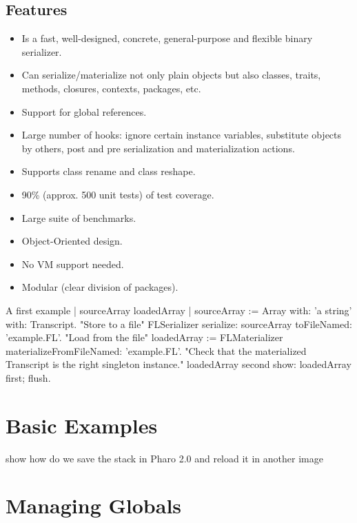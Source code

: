 \documentclass[a4paper,10pt,twoside]{book}
\begin{document}
\subsection{Features} 

\begin{itemize}

\item Is a fast, well-designed, concrete, general-purpose and flexible binary serializer.
\item Can serialize/materialize not only plain objects but also classes, traits, methods, closures, contexts, packages, etc.
\item Support for global references.
\item Large number of hooks: ignore certain instance variables, substitute objects by others, post and pre serialization and materialization actions.
\item Supports class rename and class reshape.
\item 90\% (approx. 500 unit tests) of test coverage.
\item Large suite of benchmarks.
\item Object-Oriented design.
\item No VM support needed.
\item Modular (clear division of packages).

\end{itemize}



\begin{code}{A first example}
| sourceArray loadedArray |
sourceArray := Array with: 'a string' with: Transcript.
"Store to a file"
FLSerializer serialize: sourceArray toFileNamed: 'example.FL'.
"Load from the file"
loadedArray := FLMaterializer materializeFromFileNamed: 'example.FL'.
"Check that the materialized Transcript is the right singleton instance."
loadedArray second show: loadedArray first; flush.
\end{code}



\section{Basic Examples}


show how do we save the stack in Pharo 2.0 and reload it in another image

\section{Managing Globals}
\end{document}
